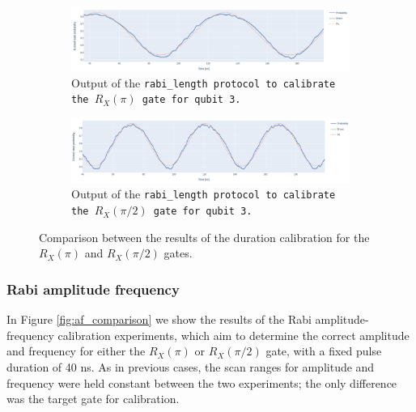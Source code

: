\begin{figure}[h!]
    \centering
    \begin{subfigure}[t]{\textwidth}
        \includegraphics[width=\textwidth]{figures/png/RX90/RabiLength/3.png}
        \caption{Output of the \tt{rabi\_length} protocol to calibrate the $R_X(\pi)$ gate for qubit \tt{3}.}
        \label{fig:3}
    \end{subfigure}
    \vspace{0.3cm}
    \begin{subfigure}[t]{\textwidth}
        \includegraphics[width=\textwidth]{figures/png/RX90/RabiLength/3_90.png}
        \caption{Output of the \tt{rabi\_length} protocol to calibrate the $R_X(\pi/2)$ gate for qubit \tt{3}.}
        \label{fig:3_90}
    \end{subfigure}
    \caption{Comparison between the results of the duration calibration for the $R_X(\pi)$ and $R_X(\pi/2)$ gates.}
    \label{fig:duration_comparison}
\end{figure}

\subsubsection{Rabi amplitude frequency}
In Figure \ref{fig:af_comparison} we show the results of the Rabi amplitude-frequency calibration experiments, which aim to determine the correct amplitude and frequency for either the $R_X(\pi)$ or $R_X(\pi/2)$ gate, with a fixed pulse duration of 40 ns.
As in previous cases, the scan ranges for amplitude and frequency were held constant between the two experiments; the only difference was the target gate for calibration.

